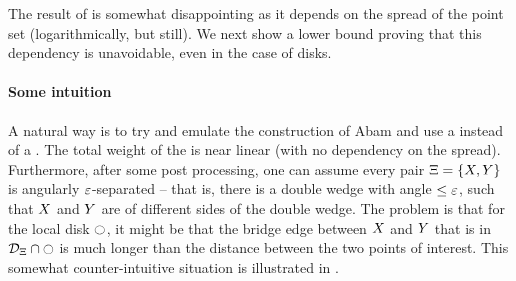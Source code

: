 \documentclass[12pt]{article}%
\begin{document}
The result of  is somewhat disappointing as it depends
on the spread of the point set (logarithmically, but still).  We next
show a lower bound proving that this dependency is unavoidable, even
in the case of disks.

\paragraph{Some intuition}
A natural way is to try and emulate the construction of Abam \etal
\cite{abfg-rftgs-09} and use a \SSPD instead of a \WSPD. The total
weight of the \SSPD is near linear (with no dependency on the
spread). Furthermore, after some post processing, one can assume every
pair $\Xi = \{ X, Y \}$ is angularly $\varepsilon$-separated -- that
is, there is a double wedge with angle $\leq \varepsilon$, such that $X$
and $Y$ are of different sides of the double wedge. The problem is
that for the local disk $\ocircle$, it might be that the bridge edge
between $X$ and $Y$ that is in $\mathcal{D}_\Xi \cap \ocircle$ is much
longer than the distance between the two points of interest. This
somewhat counter-intuitive situation is illustrated in .
\end{document}
